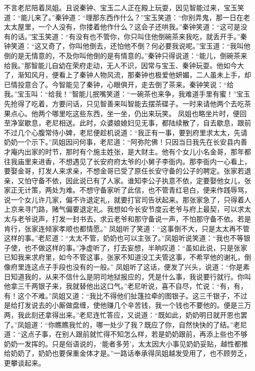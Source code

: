 \documentclass[12pt,oneside]{book}
\begin{document}
不言老尼陪着凤姐。且说秦钟、宝玉二人正在殿上玩耍，因见智能过来，宝玉笑道：“能儿来了。”秦钟道：“理那东西作什么？”宝玉笑道：“你别弄鬼，那一日在老太太屋里，一个人没有，你搂着他作什么？这会子还哄我。”秦钟笑道：“这可是没有的话。”宝玉笑道：“有没有也不管你，你只叫住他倒碗茶来我吃，就丢开手。”秦钟笑道：“这又奇了，你叫他倒去，还怕他不倒？何必要我说呢。”宝玉道：“我叫他倒的是无情意的，不及你叫他倒的是有情意的。”秦钟只得说道：“能儿，倒碗茶来给我。”那智能儿自幼在荣府走动，无人不识，因常与宝玉、秦钟玩耍。他如今大了，渐知风月，便看上了秦钟人物风流，那秦钟也极爱他妍媚，二人虽未上手，却已情投意合了。今智能见了秦钟，心眼俱开，走去倒了茶来。秦钟笑说：“给我。”宝玉叫：“给我！”智能儿抿嘴笑道：“一碗茶也来争，我难道手里有蜜！”宝玉先抢得了吃着，方要问话，只见智善来叫智能去摆茶碟子。一时来请他两个去吃茶果点心。他两个哪里吃这些东西，坐一坐，仍出来玩笑。
凤姐也略坐片时，便回至净室歇息，老尼相送。此时，众婆娘媳妇见无事，都陆续散了，自去歇息，跟前不过几个心腹常侍小婢，老尼便趁机说道：“我正有一事，要到府里求太太，先请奶奶一个示下。”凤姐因问何事，老尼道：“阿弥陀佛！只因当日我先在长安县内善才庵内出家的时节，那时有个施主姓张，是大财主。他有个女儿小名金哥，那年都往我庙里来进香，不想遇见了长安府府太爷的小舅子李衙内。那李衙内一心看上，要娶金哥，打发人来求亲，不想金哥已受了原任长安守备的公子的聘定。张家若退亲，又怕守备不依，因此说已有了人家。谁知李公子执意不依，定要娶他女儿，张家正无计策，两处为难。不想守备家听了此信，也不管青红皂白，便来作践辱骂，说一个女儿许几家，偏不许退定礼，就要打官司告状起来。那张家急了，只得着人上京来寻门路，赌气偏要退定礼。我想如今长安节度云老爷与府上最契，可以求太太与老爷说声，打发一封书去，求云老爷和那守备说一声，不怕那守备不依。若是肯行，张家连倾家孝顺也都情愿。”
凤姐听了笑道：“这事倒不大，只是太太再不管这样的事。”老尼道：“太太不管，奶奶也可以主张了。”凤姐听说笑道：“我也不等银子使，也不做这样的事。”净虚听了，打去妄想，半晌叹道：“虽如此说，只是张家已知我来求府里，如今不管这事，张家不知道没工夫管这事，不希罕他的谢礼，倒像府里连这点子手段也没有的一般。”
凤姐听了这话，便发了兴头，说道：“你是素日知道我的，从来不信什么是阴司地狱报应的，凭是什么事，我说要行就行。你叫他拿三千两银子来，我就替他出这口气。”老尼听说，喜不自尽，忙说：“有，有，有！这个不难。”凤姐又道：“我比不得他们扯篷拉牵的图银子。这三千银子，不过是给打发说去的小厮做盘缠，使他赚几个辛苦钱，我一个钱也不要他的。便是三万两，我此刻还拿得出来。”老尼连忙答应，又说道：“既如此，奶奶明日就开恩也罢了。”凤姐道：“你瞧瞧我忙的，哪一处少了我？既应了你，自然快快的了结。”老尼道：“这点子事，在别人跟前就忙得不知怎么样，若是奶奶跟前，再添上些也不够奶奶一发挥的。只是俗语说的，‘能者多劳’，太太因大小事见奶奶妥贴，越性都推给奶奶了，奶奶也要保重金体才是。”一路话奉承得凤姐越发受用了，也不顾劳乏，更攀谈起来。
\end{document}
